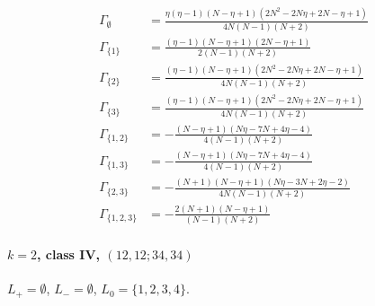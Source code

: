 \documentclass[11pt]{article}
\begin{document}
\begin{align*}
  \Gamma_{\emptyset} &= \frac{\eta \left(\eta - 1\right) \left(N - \eta + 1\right) \left(2 N^{2} - 2 N \eta + 2 N - \eta + 1\right)}{4 N \left(N - 1\right) \left(N + 2\right)} \\
  \Gamma_{\{1\}} &= \frac{\left(\eta - 1\right) \left(N - \eta + 1\right) \left(2 N - \eta + 1\right)}{2 \left(N - 1\right) \left(N + 2\right)} \\
  \Gamma_{\{2\}} &= \frac{\left(\eta - 1\right) \left(N - \eta + 1\right) \left(2 N^{2} - 2 N \eta + 2 N - \eta + 1\right)}{4 N \left(N - 1\right) \left(N + 2\right)} \\
  \Gamma_{\{3\}} &= \frac{\left(\eta - 1\right) \left(N - \eta + 1\right) \left(2 N^{2} - 2 N \eta + 2 N - \eta + 1\right)}{4 N \left(N - 1\right) \left(N + 2\right)} \\
  \Gamma_{\{1,2\}} &= - \frac{\left(N - \eta + 1\right) \left(N \eta - 7 N + 4 \eta - 4\right)}{4 \left(N - 1\right) \left(N + 2\right)} \\
  \Gamma_{\{1,3\}} &= - \frac{\left(N - \eta + 1\right) \left(N \eta - 7 N + 4 \eta - 4\right)}{4 \left(N - 1\right) \left(N + 2\right)} \\
  \Gamma_{\{2,3\}} &= - \frac{\left(N + 1\right) \left(N - \eta + 1\right) \left(N \eta - 3 N + 2 \eta - 2\right)}{4 N \left(N - 1\right) \left(N + 2\right)} \\
  \Gamma_{\{1,2,3\}} &= - \frac{2 \left(N + 1\right) \left(N - \eta + 1\right)}{\left(N - 1\right) \left(N + 2\right)} 
\end{align*}

\paragraph{$k=2$, class IV, $(12,12;34,34)$}

$L_+=\emptyset$, $L_-=\emptyset$, $L_0=\{1,2,3,4\}$.
\end{document}
